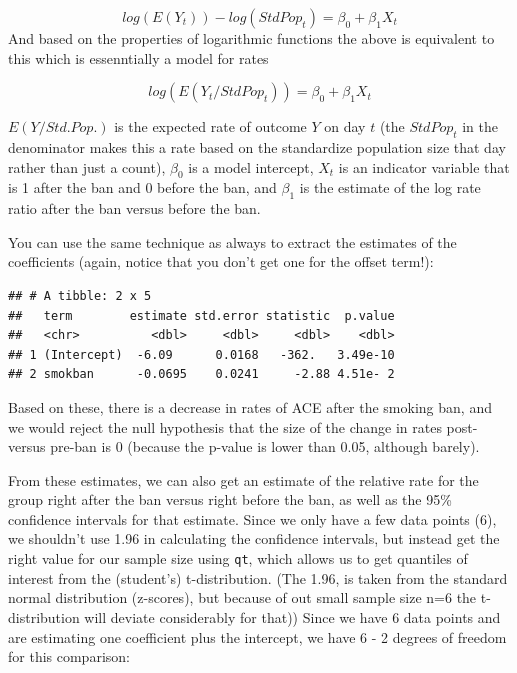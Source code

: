 \documentclass[
]{book}
\newenvironment{Shaded}{\begin{snugshade}}{\end{snugshade}}
\newcommand{\KeywordTok}[1]{\textcolor[rgb]{0.13,0.29,0.53}{\textbf{#1}}}
\newcommand{\NormalTok}[1]{#1}
\newcommand{\OperatorTok}[1]{\textcolor[rgb]{0.81,0.36,0.00}{\textbf{#1}}}
\newcommand{\StringTok}[1]{\textcolor[rgb]{0.31,0.60,0.02}{#1}}
\begin{document}
\[
log(E(Y_t)) - log(StdPop_t) = \beta_0 + \beta_1 X_t 
\]
And based on the properties of logarithmic functions the above is equivalent to this which is essenntially a model for rates

\[
log(E(Y_t/StdPop_t)) = \beta_0 + \beta_1 X_t 
\]

\(E(Y/Std.Pop.)\) is the expected rate of outcome \(Y\) on day \(t\) (the \(StdPop_t\) in the denominator makes this a rate based on the standardize population size that day rather than just a count), \(\beta_0\) is a model intercept, \(X_t\) is an indicator variable that is 1 after the ban and 0 before the ban, and \(\beta_1\) is the estimate of the log rate ratio after the ban versus before the ban.

You can use the same technique as always to extract the estimates of the coefficients (again, notice that you don't get one for the offset term!):

\begin{Shaded}
\end{Shaded}

\begin{verbatim}
## # A tibble: 2 x 5
##   term        estimate std.error statistic  p.value
##   <chr>          <dbl>     <dbl>     <dbl>    <dbl>
## 1 (Intercept)  -6.09      0.0168   -362.   3.49e-10
## 2 smokban      -0.0695    0.0241     -2.88 4.51e- 2
\end{verbatim}

Based on these, there is a decrease in rates of ACE after the smoking ban, and we would reject the null hypothesis that the size of the change in rates post- versus pre-ban is 0 (because the p-value is lower than 0.05, although barely).

From these estimates, we can also get an estimate of the relative rate for the
group right after the ban versus right before the ban, as well as the 95\% confidence intervals for that estimate. Since we only have a few data points (6), we shouldn't use 1.96 in calculating the confidence intervals, but instead get the right value for our sample size using \texttt{qt}, which allows us to get quantiles of interest from the (student's) t-distribution. (The 1.96, is taken from the standard normal distribution (z-scores), but because of out small sample size n=6 the t-distribution will deviate considerably for that)) Since we have 6 data points and are estimating one coefficient plus the intercept, we have 6 - 2 degrees of freedom for this comparison:
\end{document}

